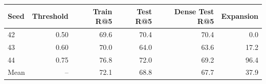 \begin{tabular}{lrrrrr}
\toprule
Seed & Threshold & Train R@5 & Test R@5 & Dense Test R@5 & Expansion \\
\midrule
42 & 0.50 & 69.6 & 70.4 & 70.4 & 0.0 \\
43 & 0.60 & 70.0 & 64.0 & 63.6 & 17.2 \\
44 & 0.75 & 76.8 & 72.0 & 69.2 & 96.4 \\
\midrule
Mean & -- & 72.1 & 68.8 & 67.7 & 37.9 \\
\bottomrule
\end{tabular}
